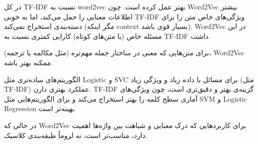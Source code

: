 \documentclass[a4paper,12pt]{article}
\begin{document}
در کل TF-IDF نسبت به word2vec بهتر عمل کرده است.
چون Word2Vec بیشتر اطلاعات معنایی را حمل می‌کند، اما به خوبی TF-IDF ویژگی‌های خاص متن را برای دسته‌بندی استخراج نمی‌کند (مگر اینکه context بسیار قوی باشد). 
Word2Vec در این مسئله خاص (با متن‌های کوتاه) کارایی کمتری نسبت به TF-IDF داشت.

برای متن‌هایی که معنی در ساختار جمله مهم‌تره (مثل مکالمه یا ترجمه)، Word2Vec ممکنه بهتر باشه.

الگوریتم‌های ساده‌تری مثل Logistic و SVC برای مسائل با داده زیاد و ویژگی زیاد (مثل TF-IDF) عملکرد بهتری دارن.
TF-IDF گزینه‌ی بهتر و دقیق‌تری است، چون ویژگی‌های آماری سطح کلمه را بهتر استخراج می‌کند و برای الگوریتم‌هایی مثل SVM و Logistic Regression بهینه‌تر است.

در حالی که Word2Vec برای کاربردهایی که درک معنایی و شباهت بین واژه‌ها اهمیت دارد، مناسب‌تر است، نه لزوماً طبقه‌بندی کلاسیک.
\end{document}
